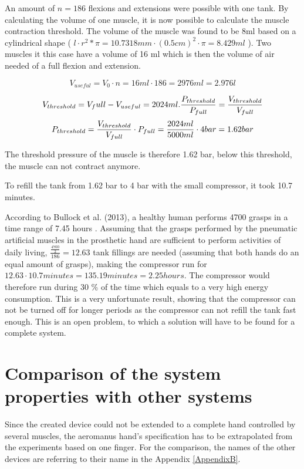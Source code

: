 \documentclass[main]{subfiles}
\begin{document}
An amount of $n = 186$ flexions and extensions were possible with one tank. By calculating the volume of one muscle, it is now possible to calculate the muscle contraction threshold.
The volume of the muscle was found to be 8ml based on a cylindrical shape ( $l \cdot r^2 * \pi = 10.7318 mm \cdot (0.5 cm)^2 \cdot \pi = 8.429 ml$ ). Two muscles it this case have a volume of 16 ml which is then the volume of air needed of a full flexion and extension. 

\[
V_{useful} = V_0 \cdot n = 16ml \cdot 186 = 2976 ml = 2.976 l
\]

\[
V_{threshold} = V_full - V_{useful} = 2024 ml.\\
\frac{P_{threshold}}{P_{full}} = \frac{V_{threshold}}{V_{full}}
\]
\[
P_{threshold} = \frac{V_{threshold}}{V_{full}} \cdot P_{full} = \frac{2024ml}{5000ml} \cdot 4 bar = 1.62 bar\\
\]

The threshold pressure of the muscle is therefore 1.62 bar, below this threshold, the muscle can not contract anymore.

To refill the tank from 1.62 bar to 4 bar with the small compressor, it took 10.7 minutes. 

According to Bullock et al. (2013), a healthy human performs 4700 grasps in a time range of 7.45 hours \cite{Bullock2013}. Assuming that the grasps performed by the pneumatic artificial muscles in the prosthetic hand are sufficient to perform activities of daily living, $\frac{\frac{4700}{2}}{186} = 12.63$ tank fillings are needed (assuming that both hands do an equal amount of grasps), making the compressor run for $12.63 \cdot 10.7 minutes = 135.19 minutes = 2.25 hours$. The compressor would therefore run during 30 \% of the time which equals to a very high energy consumption. This is a very unfortunate result, showing that the compressor can not be turned off for longer periods as the compressor can not refill the tank fast enough. This is an open problem, to which a solution will have to be found for a complete system.

\section{Comparison of the system properties with other systems}

Since the created device could not be extended to a complete hand controlled by several muscles, the aeromanus hand's specification has to be extrapolated from the experiments based on one finger. For the comparison, the names of the other devices are referring to their name in the Appendix \ref{AppendixB}.
\end{document}
